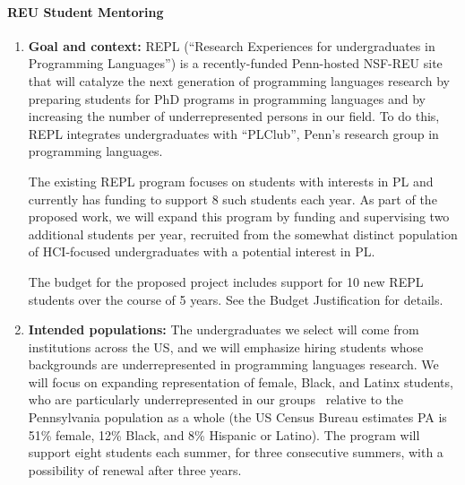 \setcounter{footnote}{0}

\paragraph*{REU Student Mentoring}

\begin{enumerate}
\item {\bf Goal and context:} REPL (``Research Experiences for
undergraduates in Programming Languages'') is a recently-funded
Penn-hosted NSF-REU site that will catalyze the next generation of
programming languages research by preparing students for PhD programs
in programming languages and by increasing the number of
underrepresented persons in our field. To do this, REPL integrates
undergraduates with ``PLClub'', Penn’s research group in programming
languages.

The existing REPL program focuses on students with interests in PL and
currently has funding to support 8 such students each year.  As part
of the proposed work, we will expand this program by funding and
supervising two additional students per year, recruited from the
somewhat distinct population of HCI-focused undergraduates with a
potential interest in PL.

The budget for the proposed project includes support for 10 new REPL
students over the course of 5 years.  See the Budget Justification for
details.

\item {\bf Intended populations:} The undergraduates we select will
come from institutions across the US, and we will emphasize hiring
students whose backgrounds are underrepresented in programming
languages research.
%
%
We will focus on expanding representation of
female, Black, and Latinx students, who are particularly
underrepresented in our
groups~\cite{taulbee2019} relative to the Pennsylvania population as a
whole (the US Census Bureau
estimates PA is 51\% female, 12\% Black, and 8\% Hispanic or Latino).  The
program will support eight students  each
summer, for three consecutive summers, with a possibility of renewal
after three years.


\end{enumerate}

